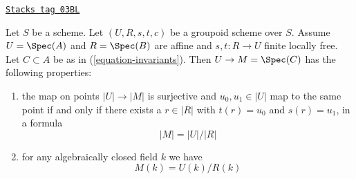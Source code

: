 \begin{lemma}[Points]
\label{groupoids-lemma-points}
\href{https://stacks.math.columbia.edu/tag/03BL}{\texttt{Stacks tag 03BL}}

Let $S$ be a scheme. Let $(U, R, s, t, c)$ be a groupoid scheme over $S$.
Assume $U = \Spec(A)$ and $R = \Spec(B)$ are affine and
$s, t : R \to U$ finite locally free. Let $C \subset A$ be as in
(\ref{equation-invariants}). Then $U \to M = \Spec(C)$ has
the following properties:
\begin{enumerate}
\item the map on points $|U| \to |M|$ is surjective and
$u_0, u_1 \in |U|$ map to the same point if and only if
there exists a $r \in |R|$ with $t(r) = u_0$ and $s(r) = u_1$, in
a formula
$$
|M| = |U|/|R|
$$
\item for any algebraically closed field $k$ we have
$$
M(k) = U(k)/R(k)
$$
\end{enumerate}
\end{lemma}

